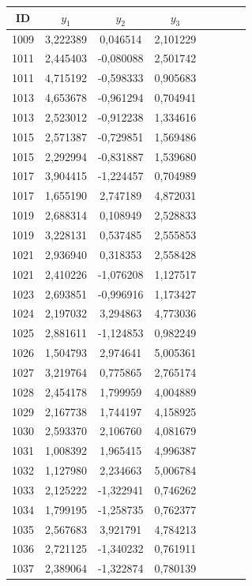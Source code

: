 \begin{apendicesenv}
\begin{table}[H]
	\centering
	\scriptsize
	\begin{tabular}{c c c c c c c c}
		\toprule
		 \centering \textbf{ID} & $y_1$ & $y_2$ & $y_3$ \\
		\midrule
		1009 & 3,222389 & 0,046514 & 2,101229 \\
		1011 & 2,445403 & -0,080088 & 2,501742 \\
		1011 & 4,715192 & -0,598333 & 0,905683 \\
		1013 & 4,653678 & -0,961294 & 0,704941 \\
		1013 & 2,523012 & -0,912238 & 1,334616 \\
		1015 & 2,571387 & -0,729851 & 1,569486 \\
		1015 & 2,292994 & -0,831887 & 1,539680 \\
		1017 & 3,904415 & -1,224457 & 0,704989 \\
		1017 & 1,655190 & 2,747189 & 4,872031 \\
		1019 & 2,688314 & 0,108949 & 2,528833 \\
		1019 & 3,228131 & 0,537485 & 2,555853 \\
		1021 & 2,936940 & 0,318353 & 2,558428 \\
		1021 & 2,410226 & -1,076208 & 1,127517 \\
		1023 & 2,693851 & -0,996916 & 1,173427  \\
		1024 & 2,197032 & 3,294863 & 4,773036 \\
		1025 & 2,881611 & -1,124853 & 0,982249 \\
		1026 & 1,504793 & 2,974641 & 5,005361 \\
		1027 & 3,219764 & 0,775865 & 2,765174 \\
		1028 & 2,454178 & 1,799959 & 4,004889 \\
		1029 & 2,167738 & 1,744197 & 4,158925 \\
		1030 & 2,593370 & 2,106760 & 4,081679 \\
		1031 & 1,008392 & 1,965415 & 4,996387 \\
		1032 & 1,127980 & 2,234663 & 5,006784 \\
		1033 & 2,125222 & -1,322941 & 0,746262 \\
		1034 & 1,799195 & -1,258735 & 0,762377 \\
		1035 & 2,567683 & 3,921791 & 4,784213 \\
		1036 & 2,721125 & -1,340232 & 0,761911 \\
		1037 & 2,389064 & -1,322874 & 0,780139 \\

\end{tabular}
\end{table}
\end{apendicesenv}
